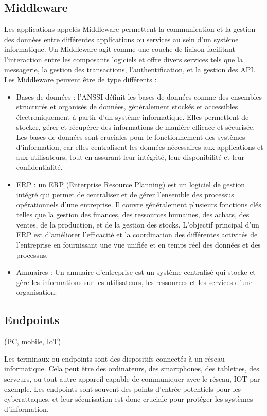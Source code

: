 \subsection{Middleware}

Les applications appelés Middleware permettent la communication et la gestion des données entre différentes applications ou services au sein d'un système informatique. 
Un Middleware agit comme une couche de liaison facilitant l'interaction entre les composants logiciels et offre divers services tels que la messagerie, la gestion des transactions, l'authentification, et la gestion des API.
Les Middleware peuvent être de type différents : 
\begin{itemize}
    \item Bases de données : l'ANSSI définit les bases de données comme des ensembles structurés et organisés de données, généralement stockés et accessibles électroniquement à partir d'un système informatique. Elles permettent de stocker, gérer et récupérer des informations de manière efficace et sécurisée. Les bases de données sont cruciales pour le fonctionnement des systèmes d'information, car elles centralisent les données nécessaires aux applications et aux utilisateurs, tout en assurant leur intégrité, leur disponibilité et leur confidentialité.
    \item ERP : un ERP (Enterprise Resource Planning) est un logiciel de gestion intégré qui permet de centraliser et de gérer l'ensemble des processus opérationnels d'une entreprise. Il couvre généralement plusieurs fonctions clés telles que la gestion des finances, des ressources humaines, des achats, des ventes, de la production, et de la gestion des stocks. L'objectif principal d'un ERP est d'améliorer l'efficacité et la coordination des différentes activités de l'entreprise en fournissant une vue unifiée et en temps réel des données et des processus.
    \item Annuaires : Un annuaire d'entreprise est un système centralisé qui stocke et gère les informations sur les utilisateurs, les ressources et les services d'une organisation.
\end{itemize}

\subsection{Endpoints}
(PC, mobile, IoT)

Les terminaux ou endpoints sont des dispositifs connectés à un réseau informatique. Cela peut être des ordinateurs, des smartphones, des tablettes, des serveurs, ou tout autre appareil capable de communiquer avec le réseau, IOT par exemple. Les endpoints sont souvent des points d'entrée potentiels pour les cyberattaques, et leur sécurisation est donc cruciale pour protéger les systèmes d'information.

